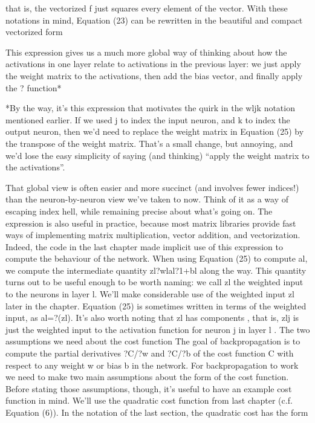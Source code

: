 that is, the vectorized f just squares every element of the vector.
With these notations in mind, Equation (23) can be rewritten in the beautiful and compact vectorized form 

This expression gives us a much more global way of thinking about how the activations in one layer relate to activations in the previous layer: we just apply the weight matrix to the activations, then add the bias vector, and finally apply the ? function* 

*By the way, it's this expression that motivates the quirk in the wljk notation mentioned earlier. If we used j to index the input neuron, and k to index the output neuron, then we'd need to replace the weight matrix in Equation (25) by the transpose of the weight matrix. That's a small change, but annoying, and we'd lose the easy simplicity of saying (and thinking) ``apply the weight matrix to the activations''.

That global view is often easier and more succinct (and involves fewer indices!) than the neuron-by-neuron view we've taken to now. Think of it as a way of escaping index hell, while remaining precise about what's going on. The expression is also useful in practice, because most matrix libraries provide fast ways of implementing matrix multiplication, vector addition, and vectorization. Indeed, the code in the last chapter made implicit use of this expression to compute the behaviour of the network.
When using Equation (25) to compute al, we compute the intermediate quantity zl?wlal?1+bl along the way. This quantity turns out to be useful enough to be worth naming: we call zl the weighted input to the neurons in layer l. We'll make considerable use of the weighted input zl later in the chapter. Equation (25) is sometimes written in terms of the weighted input, as al=?(zl). It's also worth noting that zl has components , that is, zlj is just the weighted input to the activation function for neuron j in layer l
.
The two assumptions we need about the cost function
The goal of backpropagation is to compute the partial derivatives ?C/?w and ?C/?b of the cost function C with respect to any weight w or bias b in the network. For backpropagation to work we need to make two main assumptions about the form of the cost function. Before stating those assumptions, though, it's useful to have an example cost function in mind. We'll use the quadratic cost function from last chapter (c.f. Equation (6)). In the notation of the last section, the quadratic cost has the form 

